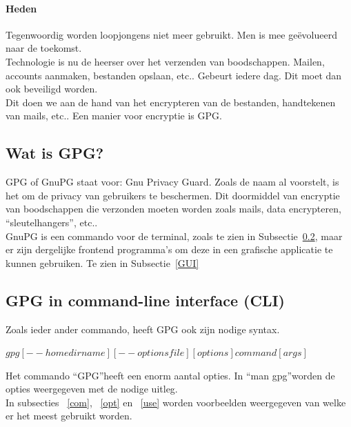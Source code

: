 \documentclass[12pt]{article}
\begin{document}
			\newpage
			\paragraph{Heden}
				Tegenwoordig worden loopjongens niet meer gebruikt. Men is mee ge\"evolueerd naar de toekomst.\\
				Technologie is nu de heerser over het verzenden van boodschappen.
				Mailen, accounts aanmaken, bestanden opslaan, etc.. Gebeurt iedere dag. Dit moet dan ook beveiligd worden.\\
				Dit doen we aan de hand van het encrypteren van de bestanden, handtekenen van mails,
				etc..
				Een manier voor encryptie is GPG.

			\newpage
			\subsection{Wat is GPG?}\label{Wat}
				GPG of GnuPG staat voor: Gnu Privacy Guard. Zoals de naam al voorstelt, is het om de privacy van gebruikers te beschermen. Dit doormiddel van encryptie van boodschappen 								die verzonden moeten worden zoals mails, data encrypteren, \textquotedblleft sleutelhangers\textquotedblright, etc.. \\
				GnuPG is een commando voor de terminal, zoals te zien in Subsectie~\ref{CLI}, maar er zijn dergelijke frontend programma's om deze in een grafische applicatie te 						kunnen gebruiken. Te zien in Subsectie~\ref{GUI}

			\subsection{GPG in command-line interface (CLI)}\label{CLI}
				Zoals ieder ander commando, heeft GPG ook zijn nodige syntax.\\
				\begin{center}
					$gpg  [--homedir name]  [--options file]  [options]  command  [args]$\\
				\end{center}
				Het commando \textquotedblleft GPG\textquotedblright heeft een enorm aantal opties. In \textquotedblleft man gpg\textquotedblright worden de opties weergegeven met de nodige uitleg.\\
				In subsecties ~\ref{com}, ~\ref{opt} en ~\ref{use} worden voorbeelden weergegeven van welke er het meest gebruikt worden.\\
				
\end{document}
